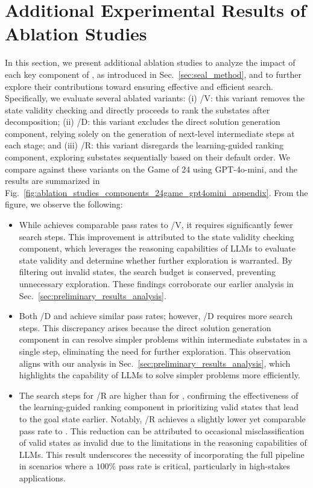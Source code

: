 \section{Additional Experimental Results of Ablation Studies}
\label{appendix:additional_results_of_ablation_studies}
In this section, we present additional ablation studies to analyze the impact of each key component of \method, as introduced in Sec.~\ref{sec:seal_method}, and to further explore their contributions toward ensuring effective and efficient search. Specifically, we evaluate several ablated variants: (i) \method/V: this variant removes the state validity checking and directly proceeds to rank the substates after decomposition; (ii) \method/D: this variant excludes the direct solution generation component, relying solely on the generation of next-level intermediate steps at each stage; and (iii) \method/R: this variant disregards the learning-guided ranking component, exploring substates sequentially based on their default order. We compare \method against these variants on the Game of 24 using GPT-4o-mini, and the results are summarized in Fig.~\ref{fig:ablation_studies_components_24game_gpt4omini_appendix}. From the figure, we observe the following:
\begin{itemize}[leftmargin=*]
    \item While \method achieves comparable pass rates to \method/V, it requires significantly fewer search steps. This improvement is attributed to the state validity checking component, which leverages the reasoning capabilities of LLMs to evaluate state validity and determine whether further exploration is warranted. By filtering out invalid states, the search budget is conserved, preventing unnecessary exploration. These findings corroborate our earlier analysis in Sec.~\ref{sec:preliminary_results_analysis}.
    \item Both \method/D and \method achieve similar pass rates; however, \method/D requires more search steps. This discrepancy arises because the direct solution generation component in \method can resolve simpler problems within intermediate substates in a single step, eliminating the need for further exploration. This observation aligns with our analysis in Sec.~\ref{sec:preliminary_results_analysis}, which highlights the capability of LLMs to solve simpler problems more efficiently.
    \item The search steps for \method/R are higher than for \method, confirming the effectiveness of the learning-guided ranking component in prioritizing valid states that lead to the goal state earlier. Notably, \method/R achieves a slightly lower yet comparable pass rate to \method. This reduction can be attributed to occasional misclassification of valid states as invalid due to the limitations in the reasoning capabilities of LLMs. This result underscores the necessity of incorporating the full \method pipeline in scenarios where a $100\%$ pass rate is critical, particularly in high-stakes applications.
\end{itemize}


